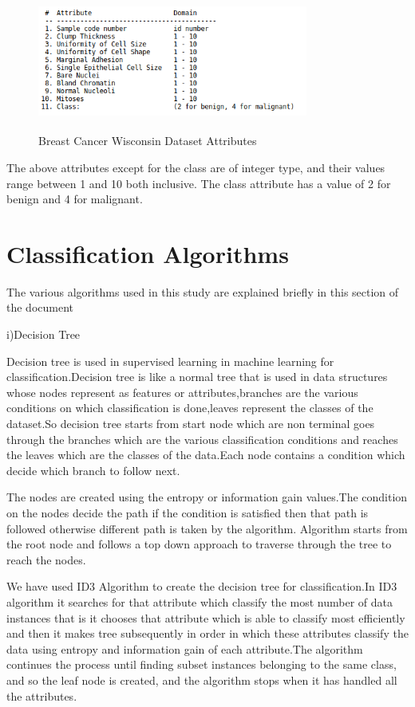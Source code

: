 \documentclass[conference,compsoc]{IEEEtran}
\begin{document}
\begin{figure}[H]
\centering
\includegraphics[width=3.5in,height=1.8in]{1.png}
\caption{Breast Cancer Wisconsin Dataset Attributes}
\label{fig_error}

\end{figure}  
 The above attributes except for the class are of integer type, and their values range between 1 and 10 both inclusive. The class attribute has a value of 2 for benign and 4 for malignant.  

\section{Classification Algorithms}
The various algorithms used in this study are explained briefly in this section of the document
\newline

i)Decision Tree
\newline
\par
Decision tree is used in supervised learning in machine learning for classification.Decision tree is like a normal tree that is used in data structures whose nodes  represent as features or attributes,branches are the various conditions on which classification is done,leaves represent the classes of the dataset.So decision tree starts from start node which are non terminal goes through the branches which are the various classification conditions and reaches the leaves which are the classes of the data.Each node contains a condition which decide which branch to follow next.
\par
The nodes are created using the entropy or information gain values.The condition on the nodes decide the path if the condition is satisfied then that path is followed otherwise different path is taken by the algorithm.
Algorithm starts from the root node and follows a top down approach to traverse through the tree to reach the nodes.
\par 
We have used ID3 Algorithm to create the decision tree for classification.In ID3 algorithm it searches for that attribute which classify the most number of data instances that is it chooses that attribute which is able to classify most efficiently and then it makes tree subsequently in order in which these attributes classify the data using entropy and information gain of each attribute.The algorithm continues the process until finding subset instances belonging to the same class, and so the leaf node is created, and the algorithm stops when it has handled all the attributes.
\end{document}
